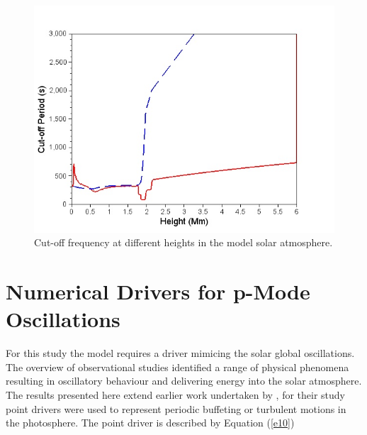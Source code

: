 \documentclass[authoryear,final,1p]{elsarticle}
\begin{document}

\begin{figure}[h]
\includegraphics[scale=0.7]{images/cutofffrequency_fig4.jpg}
\caption{Cut-off frequency at different heights in the model  solar atmosphere. }
\label{Fig2}
\end{figure}

\section{Numerical Drivers for p-Mode Oscillations}
For this study the model requires a driver mimicing the solar global oscillations.  The overview of observational studies identified a range of physical phenomena resulting in oscillatory behaviour and delivering energy into the solar atmosphere.  The results presented here extend earlier work undertaken by  \citet{Malins2007A}, for their study point drivers were used to represent periodic buffeting or turbulent motions in the photosphere. The point driver is described by Equation (\ref{e10}) 
\end{document}

